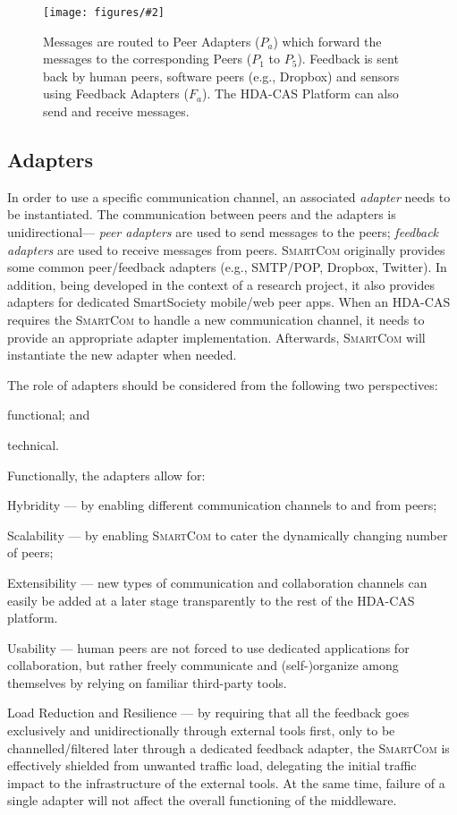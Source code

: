 \documentclass{llncs}
\newcommand{\mdl}{\textsc{SmartCom}}
\newcommand{\figcol}[3][0.9]{
\begin{figure}[H] %
\centering
\texttt{[image: figures/\#2]}
\caption{#3}
\label{fig:#2}
\end{figure}
}
\begin{document}
    \figcol[1.0]{routes}{Messages are routed to Peer Adapters ($P_a$) which forward the messages to the corresponding Peers ($P_1$ to $P_5$). Feedback is sent back by human peers, software peers (e.g., Dropbox) and sensors using Feedback Adapters ($F_a$). The HDA-CAS Platform can also send and receive messages.}

  \subsection{Adapters}
  \label{sec:adapters}

    In order to use a specific communication channel, an associated \emph{adapter} needs to be instantiated. The communication between peers and the adapters is unidirectional--- \emph{peer adapters} are used to send messages to the peers; \emph{feedback adapters} are used to receive messages from peers. 
    \mdl{} originally provides some common peer/feedback adapters  (e.g., SMTP/POP, Dropbox, Twitter). In addition, being developed in the context of a research project, it also provides adapters for dedicated SmartSociety mobile/web peer apps. When an HDA-CAS requires the \mdl{} to handle a new communication channel, it needs to provide an appropriate adapter implementation. Afterwards, \mdl{} will instantiate the new adapter when needed.

    The role of adapters should be considered from the following two perspectives:
    \begin{inparaenum}[\itshape i)]
    \item functional; and 
    \item technical.
    \end{inparaenum}

    Functionally, the adapters allow for:
    \begin{inparaenum}[\itshape a)]
    \item Hybridity --- by enabling different communication channels to and from peers;
    \item Scalability --- by enabling \mdl{} to cater the dynamically changing number of peers;
    \item Extensibility --- new types of communication and collaboration channels can easily be added at a later stage transparently to the rest of the HDA-CAS platform.
    \item Usability --- human peers are not forced to use dedicated applications for collaboration, but rather freely communicate and (self-)organize among themselves by relying on familiar third-party tools.
    \item Load Reduction and Resilience --- by requiring that all the feedback goes exclusively and unidirectionally through external tools first, only to be channelled/filtered later through a dedicated feedback adapter, the \mdl{} is effectively shielded from unwanted traffic load, delegating the initial traffic impact to the infrastructure of the external tools. At the same time, failure of a single adapter will not affect the overall functioning of the middleware.
    \end{inparaenum}
\end{document}
